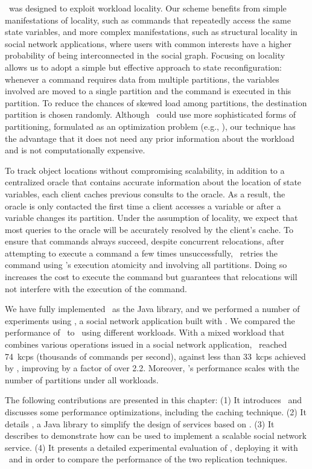\dssmr\ was designed to exploit workload locality. Our scheme benefits from
simple manifestations of locality, such as commands that repeatedly access the
same state variables, and more complex manifestations, such as structural
locality in social network applications, where users with common interests have
a higher probability of being interconnected in the social graph. Focusing on
locality allows us to adopt a simple but effective approach to state
reconfiguration: whenever a command requires data from multiple partitions, the
variables involved are moved to a single partition and the command is executed
in this partition. To reduce the chances of skewed load among partitions,
the destination partition is chosen randomly. Although \dssmr\ could use more
sophisticated forms of partitioning, formulated as an optimization problem
(e.g., \cite{curino2010sch,taft2014est}), our technique has the advantage that
it does not need any prior information about the workload and is not
computationally expensive.

To track object locations without compromising scalability, in addition to a
centralized oracle that contains accurate information about the location of
state variables, each client caches previous consults to the oracle. As a
result, the oracle is only contacted the first time a client accesses a variable
or after a variable changes its partition. Under the assumption of locality, we
expect that most queries to the oracle will be accurately resolved by the
client's cache. To ensure that commands always succeed, despite concurrent
relocations, after attempting to execute a command a few times unsuccessfully,
\dssmr\ retries the command using \ssmr{}'s execution atomicity and involving
all partitions. Doing so increases the cost to execute the command but
guarantees that relocations will not interfere with the execution of the
command.

We have fully implemented \dssmr\ as the \dssmrlibname{} Java library, and we
performed a number of experiments using \dssmrappname{}, a social network
application built with \dssmrlibname{}. We compared the performance of \dssmr\
to \ssmr\ using different workloads. With a mixed workload that combines various
operations issued in a social network application, \dssmr\ reached 74~kcps
(thousands of commands per second), against less than 33~kcps achieved by
\ssmr{}, improving by a factor of over 2.2. Moreover, \dssmr's performance
scales with the number of partitions under all workloads.

The following contributions are presented in this chapter:
(1) It introduces \dssmr\ and discusses some performance optimizations, including
the caching technique.
(2) It details \dssmrlibname{}, a Java library to simplify the design of services based
on \dssmr{}.
(3) It describes \dssmrappname{} to demonstrate how \dssmrlibname{} can be used to implement
a scalable social network service.
(4) It presents a detailed experimental evaluation of \dssmrappname{}, deploying it with
\ssmr\ and \dssmr{} in order to compare the performance of the two replication
techniques.

